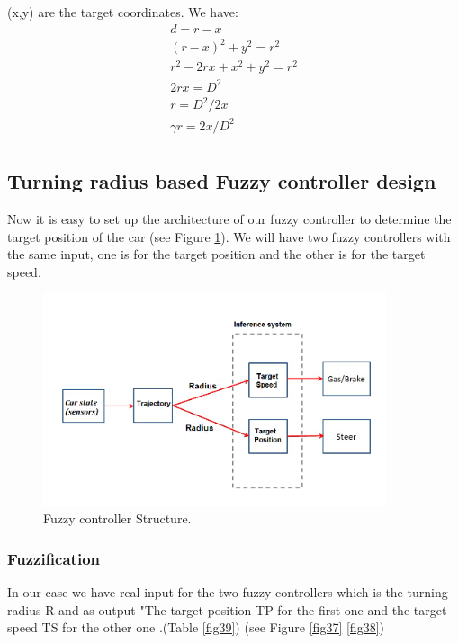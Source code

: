 \documentclass{llncs}
\begin{document}
(x,y) are the target coordinates. We have:\\
\begin{gather}
d = r - x\\
(r - x)^2 + y^2 = r^2  \\
r^2 - 2rx + x^2 + y^2 = r^2\\	
2rx = D^2\\	
r = D^2/2x\\
\gamma r = 2x/D^2\\
\end{gather}	

\subsection{Turning radius based Fuzzy controller design}
Now it is easy to set up the architecture of our fuzzy controller to determine the target position of the car (see Figure \ref {fig36}). We will have two fuzzy controllers with the same input, one is for the target position and the other is for the target speed. 
\begin{figure}[h!]
	
	\centering
	\includegraphics[width=0.9\textwidth]{fig/rayon21.png}
	\begin{minipage}{10cm}
		\centering
		\caption{\footnotesize Fuzzy controller Structure.}
		\label{fig36}
	\end{minipage} 
	
\end{figure}

\subsubsection{Fuzzification}

In our case we have real input for the two fuzzy controllers which is the turning radius R and as output "The target position TP  for the first one and the target speed TS  for the other one .(Table \ref{fig39}) (see Figure \ref{fig37} \ref{fig38})
\end{document}
